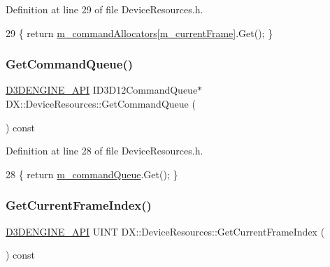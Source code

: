 Definition at line 29 of file Device\+Resources.\+h.


\begin{DoxyCode}
29 \{ \textcolor{keywordflow}{return} \mbox{\hyperlink{class_d_x_1_1_device_resources_afdaf82b33be14ee78ab6e540f4b63785}{m\_commandAllocators}}[\mbox{\hyperlink{class_d_x_1_1_device_resources_ac5373e60722eaa25c1068aa754b501fa}{m\_currentFrame}}].Get(); \}
\end{DoxyCode}
\mbox{\label{class_d_x_1_1_device_resources_adabcf266dec101a537eebbce5f74cfdd}} 
\subsubsection{\texorpdfstring{Get\+Command\+Queue()}{GetCommandQueue()}}
{\footnotesize\ttfamily \mbox{\hyperlink{stdafx_8h_a8ee2d990c5dfba7794dd2b60741d7722}{D3\+D\+E\+N\+G\+I\+N\+E\+\_\+\+A\+PI}} I\+D3\+D12\+Command\+Queue$\ast$ D\+X\+::\+Device\+Resources\+::\+Get\+Command\+Queue (\begin{DoxyParamCaption}{ }\end{DoxyParamCaption}) const\hspace{0.3cm}{\ttfamily [inline]}}



Definition at line 28 of file Device\+Resources.\+h.


\begin{DoxyCode}
28 \{ \textcolor{keywordflow}{return} \mbox{\hyperlink{class_d_x_1_1_device_resources_a0f0882523aa09b109f3a7bc05ff01f46}{m\_commandQueue}}.Get(); \}
\end{DoxyCode}
\mbox{\label{class_d_x_1_1_device_resources_af83cb32755c057e0750edec07a8e95de}} 
\subsubsection{\texorpdfstring{Get\+Current\+Frame\+Index()}{GetCurrentFrameIndex()}}
{\footnotesize\ttfamily \mbox{\hyperlink{stdafx_8h_a8ee2d990c5dfba7794dd2b60741d7722}{D3\+D\+E\+N\+G\+I\+N\+E\+\_\+\+A\+PI}} U\+I\+NT D\+X\+::\+Device\+Resources\+::\+Get\+Current\+Frame\+Index (\begin{DoxyParamCaption}{ }\end{DoxyParamCaption}) const\hspace{0.3cm}{\ttfamily [inline]}}




